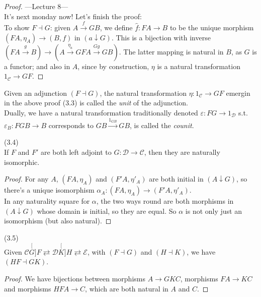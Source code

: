 \documentclass[a4paper]{article}
\begin{document}
\begin{thm}
\begin{proof}
        ---Lecture 8---\\
        It's next monday now! Let's finish the proof:\\
        To show $F \dashv G$: given $A \xrightarrow{f} GB$, we define $\hat{f}:FA \to B$ to be the unique morphism $(FA,\eta_A) \to (B,f)$ in $(a \downarrow G)$. This is a bijection with inverse $(FA \xrightarrow{g} B) \to (A \xrightarrow{\eta_a} GFA \xrightarrow{Gg} GB)$. The latter mapping is natural in $B$, as $G$ is a functor; and also in $A$, since by construction, $\eta$ is a natural transformation $1_{\mathcal{C}} \to GF$.
    \end{proof}
\end{thm}

Given an adjunction $(F \dashv G)$, the natural transformation $\eta:1_{\mathcal{C}} \to GF$ emergin in the above proof (3.3) is called the \emph{unit} of the adjunction.\\
Dually, we have a natural transformation traditionally denoted $\varepsilon: FG \to 1_{\mathcal{D}}$ s.t. $\varepsilon_B:FGB \to B$ corresponds to $GB \xrightarrow{1_{GB}} GB$, is called the \emph{counit}.

\begin{coro} (3.4)\\
    If $F$ and $F'$ are both left adjoint to $G:\mathcal{D} \to \mathcal{C}$, then they are naturally isomorphic.
    \begin{proof}
        For any $A$, $(FA,\eta_A)$ and $(F'A,\eta'_A)$ are both initial in $(A\downarrow G)$, so there's a unique isomorphism $\alpha_A:(FA,\eta_A) \to (F'A,\eta'_A)$.\\
        In any naturality square for $\alpha$, the two ways round are both morphisms in $(A\downarrow G)$ whose domain is initial, so they are equal. So $\alpha$ is not only just an isomorphism (but also natural).
    \end{proof}
\end{coro}

\begin{lemma} (3.5)\\
    Given $\mathcal{C} \stackrel[G]{F}{\rightleftarrows} \mathcal{D} \stackrel[K]{H}{\rightleftarrows} \mathcal{E}$, with $(F \dashv G)$ and $(H \dashv K)$, we have $(HF \dashv GK)$.
    \begin{proof}
        We have bijections between morphisms $A \to GKC$, morphisms $FA \to KC$ and morphisms $HFA \to C$, which are both natural in $A$ and $C$.
    \end{proof}
\end{lemma}
\end{document}
